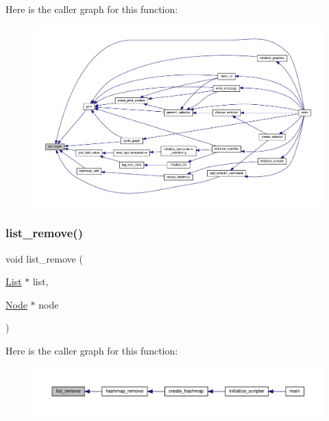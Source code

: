 Here is the caller graph for this function\+:
\nopagebreak
\begin{figure}[H]
\begin{center}
\leavevmode
\includegraphics[width=350pt]{linked-list_8c_a947069a28d8173531d9186a74e82fb62_icgraph}
\end{center}
\end{figure}
\mbox{\label{linked-list_8c_ad17dd6e2d3e64d3e9665f313ffb808a1}} 
\subsubsection{\texorpdfstring{list\+\_\+remove()}{list\_remove()}}
{\footnotesize\ttfamily void list\+\_\+remove (\begin{DoxyParamCaption}\item[{\hyperlink{structList}{List} $\ast$}]{list,  }\item[{\hyperlink{structNode}{Node} $\ast$}]{node }\end{DoxyParamCaption})}

Here is the caller graph for this function\+:
\nopagebreak
\begin{figure}[H]
\begin{center}
\leavevmode
\includegraphics[width=350pt]{linked-list_8c_ad17dd6e2d3e64d3e9665f313ffb808a1_icgraph}
\end{center}
\end{figure}
